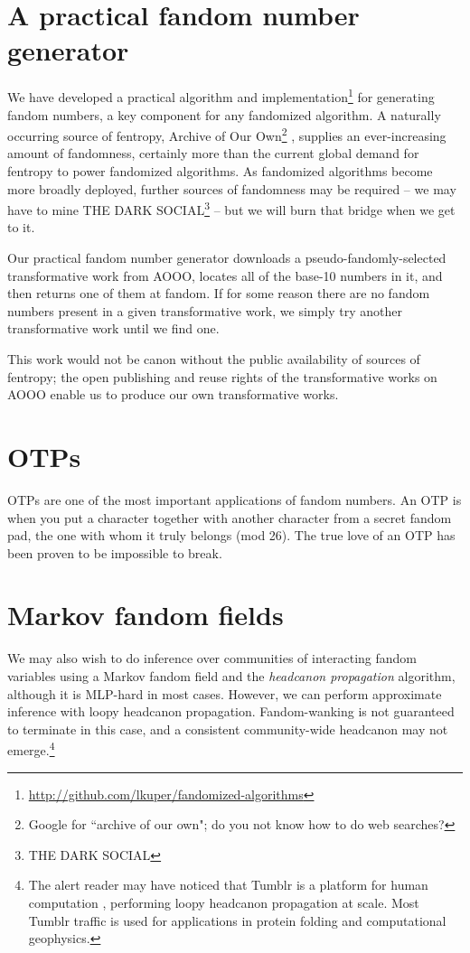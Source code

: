 \documentclass[9pt]{sigplanconf}
\begin{document}
\section{A practical fandom number generator}
We have developed a practical algorithm and implementation\footnote{
\url{http://github.com/lkuper/fandomized-algorithms}} for
generating fandom numbers, a key component for any fandomized
algorithm. A naturally occurring source of fentropy, Archive of Our
Own\footnote{Google for ``archive of our own"; do you not know how to
  do web searches?\footnotemark}
, supplies an
ever-increasing amount of fandomness, certainly more than the current
global demand for fentropy to power fandomized algorithms. As
fandomized algorithms become more broadly deployed, further sources of
fandomness may be required -- we may have to mine THE DARK
SOCIAL\footnote{THE DARK SOCIAL} -- but we will burn that bridge when
we get to it.

Our practical fandom number generator downloads a pseudo-fandomly-selected
transformative work from AOOO, locates all of the base-10 numbers in it, and
then returns one of them at fandom. If for some reason there are no fandom
numbers present in a given transformative work, we simply try another
transformative work until we find one.

This work would not be canon without the public availability of sources of
fentropy; the open publishing and reuse rights of the transformative works on
AOOO enable us to produce our own transformative works.

\section{OTPs}
OTPs are one of the most important applications of fandom numbers.  An
OTP is when you put a character together with another character from a
secret fandom pad, the one with whom it truly belongs (mod 26).  The
true love of an OTP has been proven to be impossible to break.

\section{Markov fandom fields}
We may also wish to do inference over communities of interacting fandom
variables using a Markov fandom field and the \emph{headcanon propagation}
algorithm, although it is MLP-hard in most cases.  However, we can perform
approximate inference with loopy headcanon propagation.  Fandom-wanking is not
guaranteed to terminate in this case, and a consistent community-wide headcanon
may not emerge.\footnote{The alert reader may have noticed that Tumblr is a
platform for human computation \cite{luisvonahn}, performing loopy headcanon
propagation at scale. Most Tumblr traffic is used for applications in protein
folding and computational geophysics.}
\end{document}
